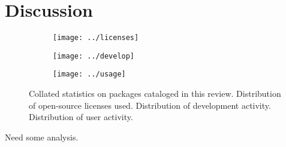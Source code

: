 \section{Discussion}

\begin{figure*}
\centering
\begin{subfigure}[t]{.3\linewidth}
\centering \label{licenses}
\texttt{[image: ../licenses]}
\end{subfigure}
\hfill
\begin{subfigure}[t]{.3\linewidth}
\centering \label{develop}
\texttt{[image: ../develop]}
\end{subfigure}
\hfill
\begin{subfigure}[t]{.3\linewidth}
\centering \label{usage}
\texttt{[image: ../usage]}
\end{subfigure}

\caption{\label{pies} Collated statistics on packages cataloged in this review.  Distribution of open-source licenses used.
 Distribution of development activity.  Distribution of user activity.
}
\end{figure*}

Need some analysis.
